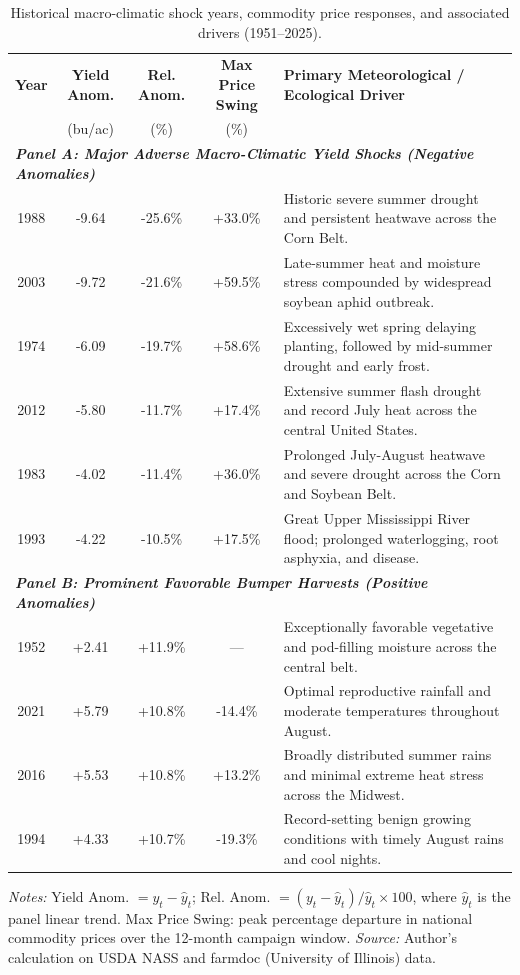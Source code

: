 \begin{table}[htbp]
\centering
\small
\caption{Historical macro-climatic shock years, commodity price responses, and associated drivers (1951--2025).}
\label{tab:yield_shocks}
\begin{tabularx}{\textwidth}{c c c c X}
\toprule
\textbf{Year} & \textbf{Yield Anom.} & \textbf{Rel. Anom.} & \textbf{Max Price Swing} & \textbf{Primary Meteorological / Ecological Driver} \\
 & (bu/ac) & (\%) & (\%) & \\
\midrule
\multicolumn{5}{l}{\textit{\textbf{Panel A: Major Adverse Macro-Climatic Yield Shocks (Negative Anomalies)}}} \\[0.5ex]
1988 & -9.64 & -25.6\% & +33.0\% & Historic severe summer drought and persistent heatwave across the Corn Belt. \\
2003 & -9.72 & -21.6\% & +59.5\% & Late-summer heat and moisture stress compounded by widespread soybean aphid outbreak. \\
1974 & -6.09 & -19.7\% & +58.6\% & Excessively wet spring delaying planting, followed by mid-summer drought and early frost. \\
2012 & -5.80 & -11.7\% & +17.4\% & Extensive summer flash drought and record July heat across the central United States. \\
1983 & -4.02 & -11.4\% & +36.0\% & Prolonged July-August heatwave and severe drought across the Corn and Soybean Belt. \\
1993 & -4.22 & -10.5\% & +17.5\% & Great Upper Mississippi River flood; prolonged waterlogging, root asphyxia, and disease. \\
\midrule
\multicolumn{5}{l}{\textit{\textbf{Panel B: Prominent Favorable Bumper Harvests (Positive Anomalies)}}} \\[0.5ex]
1952 & +2.41 & +11.9\% & --- & Exceptionally favorable vegetative and pod-filling moisture across the central belt. \\
2021 & +5.79 & +10.8\% & -14.4\% & Optimal reproductive rainfall and moderate temperatures throughout August. \\
2016 & +5.53 & +10.8\% & +13.2\% & Broadly distributed summer rains and minimal extreme heat stress across the Midwest. \\
1994 & +4.33 & +10.7\% & -19.3\% & Record-setting benign growing conditions with timely August rains and cool nights. \\
\bottomrule
\end{tabularx}
\vspace{1ex}
\raggedright
\footnotesize{\textit{Notes:} Yield Anom. $= y_t - \hat{y}_t$; Rel. Anom. $= (y_t - \hat{y}_t)/\hat{y}_t \times 100$, where $\hat{y}_t$ is the panel linear trend. Max Price Swing: peak percentage departure in national commodity prices over the 12-month campaign window. \textit{Source:} Author's calculation on USDA NASS and farmdoc (University of Illinois) data.}
\end{table}
